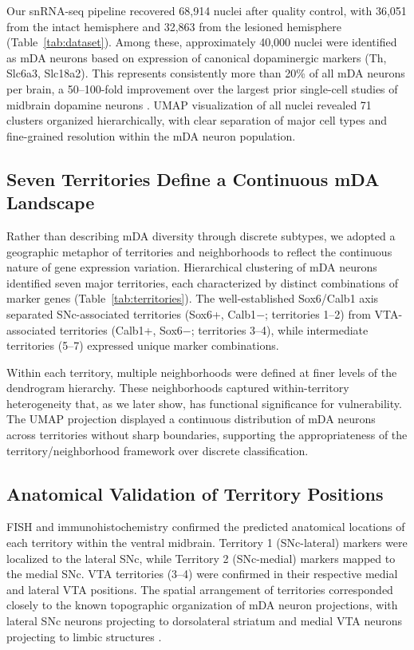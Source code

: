 \documentclass[12pt]{article}
\begin{document}
Our snRNA-seq pipeline recovered 68,914 nuclei after quality control, with 36,051 from the intact hemisphere and 32,863 from the lesioned hemisphere (Table~\ref{tab:dataset}). Among these, approximately 40,000 nuclei were identified as mDA neurons based on expression of canonical dopaminergic markers (Th, Slc6a3, Slc18a2). This represents consistently more than 20\% of all mDA neurons per brain, a 50--100-fold improvement over the largest prior single-cell studies of midbrain dopamine neurons \citep{poulin2014defining, tiklova2019single}. UMAP visualization of all nuclei revealed 71 clusters organized hierarchically, with clear separation of major cell types and fine-grained resolution within the mDA neuron population.

\subsection{Seven Territories Define a Continuous mDA Landscape}

Rather than describing mDA diversity through discrete subtypes, we adopted a geographic metaphor of territories and neighborhoods to reflect the continuous nature of gene expression variation. Hierarchical clustering of mDA neurons identified seven major territories, each characterized by distinct combinations of marker genes (Table~\ref{tab:territories}). The well-established Sox6/Calb1 axis separated SNc-associated territories (Sox6+, Calb1$-$; territories 1--2) from VTA-associated territories (Calb1+, Sox6$-$; territories 3--4), while intermediate territories (5--7) expressed unique marker combinations.

Within each territory, multiple neighborhoods were defined at finer levels of the dendrogram hierarchy. These neighborhoods captured within-territory heterogeneity that, as we later show, has functional significance for vulnerability. The UMAP projection displayed a continuous distribution of mDA neurons across territories without sharp boundaries, supporting the appropriateness of the territory/neighborhood framework over discrete classification.

\subsection{Anatomical Validation of Territory Positions}

FISH and immunohistochemistry confirmed the predicted anatomical locations of each territory within the ventral midbrain. Territory 1 (SNc-lateral) markers were localized to the lateral SNc, while Territory 2 (SNc-medial) markers mapped to the medial SNc. VTA territories (3--4) were confirmed in their respective medial and lateral VTA positions. The spatial arrangement of territories corresponded closely to the known topographic organization of mDA neuron projections, with lateral SNc neurons projecting to dorsolateral striatum and medial VTA neurons projecting to limbic structures \citep{bjorklund2007dopamine, haber2014corticostriatal}.
\end{document}
